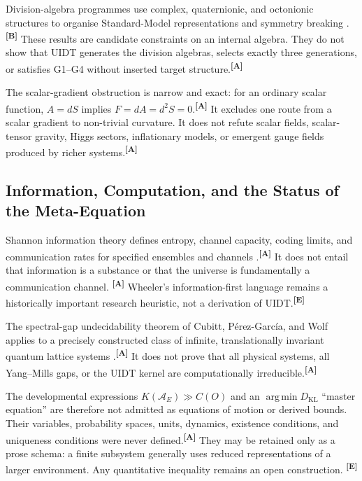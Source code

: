\documentclass[12pt,a4paper,twoside]{article}
\theoremstyle{plain}
\theoremstyle{definition}
\theoremstyle{remark}
\newcommand{\catmark}[1]{\textsuperscript{\textsf{\textbf{[#1]}}}}
\begin{document}
Division-algebra programmes use complex, quaternionic, and octonionic
structures to organise Standard-Model representations and symmetry breaking
\cite{furey2018,todorov2022,fureyhughes2022,gourlay2024}.\catmark{B} These
results are candidate constraints on an internal algebra. They do not show that
UIDT generates the division algebras, selects exactly three generations, or
satisfies G1--G4 without inserted target structure.\catmark{A}

The scalar-gradient obstruction is narrow and exact: for an ordinary scalar
function, $A=dS$ implies $F=dA=d^2S=0$.\catmark{A} It excludes one route from
a scalar gradient to non-trivial curvature. It does not refute scalar fields,
scalar-tensor gravity, Higgs sectors, inflationary models, or emergent gauge
fields produced by richer systems.\catmark{A}

\subsection{Information, Computation, and the Status of the Meta-Equation}
\label{subsec:ctx-information-computation}

Shannon information theory defines entropy, channel capacity, coding limits,
and communication rates for specified ensembles and channels
\cite{shannon1948}.\catmark{A} It does not entail that information is a
substance or that the universe is fundamentally a communication channel.
\catmark{A} Wheeler's information-first language remains a historically
important research heuristic, not a derivation of UIDT.\catmark{E}

The spectral-gap undecidability theorem of Cubitt, P\'erez-Garc\'ia, and Wolf
applies to a precisely constructed class of infinite, translationally invariant
quantum lattice systems \cite{cubitt2015}.\catmark{A} It does not prove that
all physical systems, all Yang--Mills gaps, or the UIDT kernel are
computationally irreducible.\catmark{A}

The developmental expressions $K(\mathcal A_E)\gg C(O)$ and an
$\operatorname*{arg\,min}D_{\mathrm{KL}}$ ``master equation'' are therefore
not admitted as equations of motion or derived bounds. Their variables,
probability spaces, units, dynamics, existence conditions, and uniqueness
conditions were never defined.\catmark{A} They may be retained only as a prose
schema: a finite subsystem generally uses reduced representations of a larger
environment. Any quantitative inequality remains an open construction.
\catmark{E}
\end{document}
